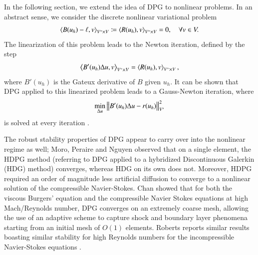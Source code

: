\documentclass[preprint,12pt]{elsarticle}
\begin{document}
In the following section, we extend the idea of DPG to nonlinear problems.  In an abstract sense, we consider the discrete nonlinear variational problem
\[
\left\langle B(u_h)-\ell,v \right\rangle_{V^*\times V} \coloneqq \left\langle R(u_h),v \right\rangle_{V^*\times V} = 0, \quad \forall v \in V.
\]
The linearization of this problem leads to the Newton iteration, defined by the step
\[
\left\langle B'(u_h)\Delta u,v \right\rangle_{V^*\times V} = \left\langle R(u_h),v \right\rangle_{V^*\times V},
\]
where $B'(u_h)$ is the Gateux derivative of $B$ given $u_h$.  It can be shown that DPG applied to this linearized problem leads to a Gauss-Newton iteration, where 
\[
\min_{\Delta u} \left\| B'(u_h)\Delta u - r(u_h) \right\|_{V'}^2
\]
is solved at every iteration \cite{Chan2013dpg}.  

The robust stability properties of DPG appear to carry over into the nonlinear regime as well; Moro, Peraire and Nguyen observed \cite{MoroNguyenPeraire11, MoroMastersThesis} that on a single element, the HDPG method (referring to DPG applied to a hybridized Discontinuous Galerkin (HDG) method) converges, whereas HDG on its own does not.  Moreover, HDPG required an order of magnitude less artificial diffusion to converge to a nonlinear solution of the compressible Navier-Stokes.  Chan \etal\cite{Chan2013dpg} showed that for both the viscous Burgers' equation and the compressible Navier Stokes equations at high Mach/Reynolds number, DPG converges on an extremely coarse mesh, allowing the use of an adaptive scheme to capture shock and boundary layer phenomena starting from an initial mesh of $O(1)$ elements.  Roberts reports similar results boasting similar stability for high Reynolds numbers for the incompressible Navier-Stokes equations \cite{NateDissertation}.  


%                                
%                                
%   
\end{document}
